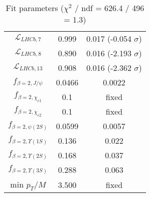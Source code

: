 \begin{table}[h!]
\begin{tabular}{c|c|c}
$\mathcal L_{LHCb,7}$ & 0.999 & 0.017 (-0.054 $\sigma$) \\
$\mathcal L_{LHCb,8}$ & 0.890 & 0.016 (-2.193 $\sigma$) \\
$\mathcal L_{LHCb,13}$ & 0.908 & 0.016 (-2.362 $\sigma$) \\
$f_{\beta=2,J/\psi}$ & 0.0466 & 0.0022 \\
$f_{\beta=2,\chi_{c1}}$ & 0.1 & fixed \\
$f_{\beta=2,\chi_{c2}}$ & 0.1 & fixed \\
$f_{\beta=2,\psi(2S)}$ & 0.0599 & 0.0057 \\
$f_{\beta=2,\Upsilon(1S)}$ & 0.136 & 0.022 \\
$f_{\beta=2,\Upsilon(2S)}$ & 0.168 & 0.037 \\
$f_{\beta=2,\Upsilon(3S)}$ & 0.288 & 0.063 \\
min $p_T/M$ & 3.500 & fixed \\
\end{tabular}
\caption{Fit parameters ($\chi^2$ / ndf = 626.4 / 496 = 1.3)}
\end{table}

